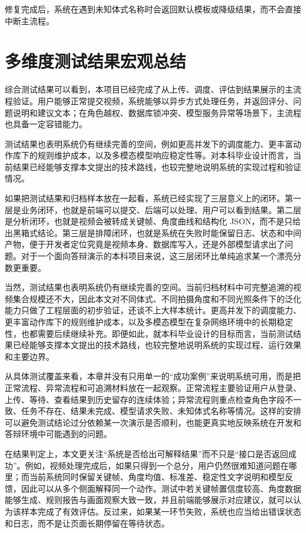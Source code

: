 \documentclass[UTF8,twoside]{ctexrep}
\makeatletter
\def@NAT@last@yr{\@citea}%
\def@NAT@last@yr{-\NAT@penalty}%
\makeatother
\begin{document}
修复完成后，系统在遇到未知体式名称时会返回默认模板或降级结果，而不会直接中断主流程。

\section{多维度测试结果宏观总结}
综合测试结果可以看到，本项目已经完成了从上传、调度、评估到结果展示的主流程验证。用户能够正常提交视频，系统能够以异步方式处理任务，并返回评分、问题说明和建议文本；在角色越权、数据库锁冲突、模型服务异常等场景下，主流程也具备一定容错能力。

测试结果也表明系统仍有继续完善的空间，例如更高并发下的调度能力、更丰富动作库下的规则维护成本，以及多模态模型响应稳定性等。对本科毕业设计而言，当前结果已经能够支撑本文提出的技术路线，也较完整地说明系统的实现过程和验证情况。

如果把测试结果和归档样本放在一起看，系统已经实现了三层意义上的闭环。第一层是业务闭环，也就是前端可以提交、后端可以处理、用户可以看到结果。第二层是分析闭环，也就是视频会被转成关键帧、角度曲线和结构化 JSON，而不是只给出黑箱式结论。第三层是排障闭环，也就是系统在失败时能保留日志、状态和中间产物，便于开发者定位究竟是视频本身、数据库写入，还是外部模型请求出了问题。对于一个面向答辩演示的本科项目来说，这三层闭环比单纯追求某一个漂亮分数更重要。

当然，测试结果也表明系统仍有继续完善的空间。当前归档材料中可完整追溯的视频集合规模还不大，因此本文对不同体式、不同拍摄角度和不同光照条件下的泛化能力只做了工程层面的初步验证，还谈不上大样本统计。更高并发下的调度能力、更丰富动作库下的规则维护成本，以及多模态模型在复杂网络环境中的长期稳定性，也都需要后续继续补充。即便如此，就本科毕业设计的目标而言，当前测试结果已经能够支撑本文提出的技术路线，也较完整地说明系统的实现过程、运行效果和主要边界。

从具体测试覆盖来看，本章并没有只用单一的“成功案例”来说明系统可用，而是把正常流程、异常流程和可追溯材料放在一起观察。正常流程主要验证用户从登录、上传、等待、查看结果到历史留存的连续体验；异常流程则重点检查角色字段不一致、任务不存在、结果未完成、模型请求失败、未知体式名称等情况。这样的安排可以避免测试结论过分依赖某一次演示是否顺利，也能更真实地反映系统在开发和答辩环境中可能遇到的问题。

在结果判定上，本文更关注“系统是否给出可解释结果”而不只是“接口是否返回成功”。例如，视频处理完成后，如果只得到一个总分，用户仍然很难知道问题在哪里；而当前系统同时保留关键帧、角度均值、标准差、稳定性文字说明和模型反馈，因此可以从多个侧面解释同一个动作。测试中若关键帧置信度较高、角度数据能够生成、规则报告与画面观察大致一致，并且前端能够展示对应建议，就可以认为该样本完成了有效评估。反过来，如果某一环节失败，系统也应当给出错误状态和日志，而不是让页面长期停留在等待状态。
\end{document}
